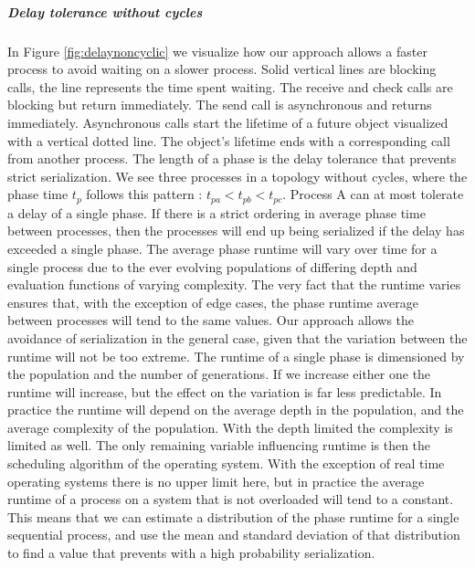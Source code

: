 \subparagraph{Delay tolerance without cycles}
In Figure \ref{fig:delaynoncyclic} we visualize how our approach allows a faster process to avoid waiting on a slower process. Solid vertical lines are blocking calls, the line represents the time spent waiting. The receive and check calls are blocking but return immediately. The send call is asynchronous and returns immediately. Asynchronous calls start the lifetime of a future object visualized with a vertical dotted line. The object's lifetime ends with a corresponding call from another process.
The length of a phase is the delay tolerance that prevents strict serialization. We see three processes in a topology without cycles, where the phase time $t_p$ follows this pattern : $t_{pa} < t_{pb} < t_{pc}$. Process A can at most tolerate a delay of a single phase. If there is a strict ordering in average phase time between processes, then the processes will end up being serialized if the delay has exceeded a single phase. The average phase runtime will vary over time for a single process due to the ever evolving populations of differing depth and evaluation functions of varying complexity. The very fact that the runtime varies ensures that, with the exception of edge cases, the phase runtime average between processes will tend to the same values. Our approach allows the avoidance of serialization in the general case, given that the variation between the runtime will not be too extreme. The runtime of a single phase is dimensioned by the population and the number of generations. If we increase either one the runtime will increase, but the effect on the variation is far less predictable. In practice the runtime will depend on the average depth in the population, and the average complexity of the population. With the depth limited the complexity is limited as well. The only remaining variable influencing runtime is then the scheduling algorithm of the operating system. With the exception of real time operating systems there is no upper limit here, but in practice the average runtime of a process on a system that is not overloaded will tend to a constant. This means that we can estimate a distribution of the phase runtime for a single sequential process, and use the mean and standard deviation of that distribution to find a value that prevents with a high probability serialization. 
